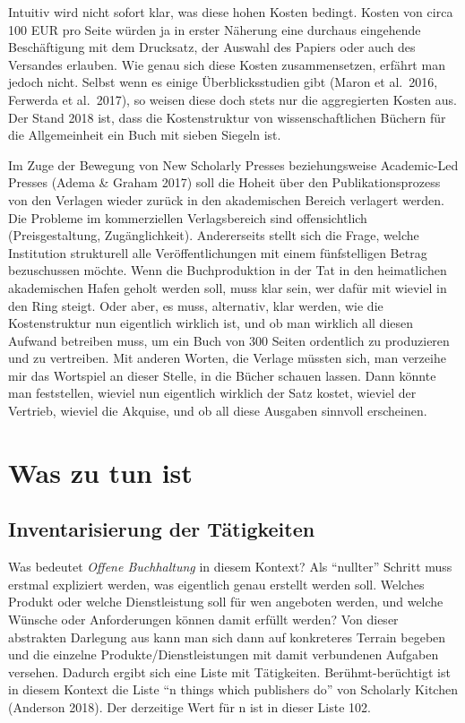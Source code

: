 \documentclass[a4paper,
fontsize=11pt,
oneside,
numbers=noperiodatend,
parskip=half-,
bibliography=totoc,
final
]{scrartcl}
\begin{document}
Intuitiv wird nicht sofort klar, was diese hohen Kosten bedingt. Kosten
von circa 100 EUR pro Seite würden ja in erster Näherung eine durchaus
eingehende Beschäftigung mit dem Drucksatz, der Auswahl des Papiers oder
auch des Versandes erlauben. Wie genau sich diese Kosten zusammensetzen,
erfährt man jedoch nicht. Selbst wenn es einige Überblicksstudien gibt
(Maron et al.~2016, Ferwerda et al.~2017), so weisen diese doch stets
nur die aggregierten Kosten aus. Der Stand 2018 ist, dass die
Kostenstruktur von wissenschaftlichen Büchern für die Allgemeinheit ein
Buch mit sieben Siegeln ist.

Im Zuge der Bewegung von New Scholarly Presses beziehungsweise
Academic-Led Presses (Adema \& Graham 2017) soll die Hoheit über den
Publikationsprozess von den Verlagen wieder zurück in den akademischen
Bereich verlagert werden. Die Probleme im kommerziellen Verlagsbereich
sind offensichtlich (Preisgestaltung, Zugänglichkeit). Andererseits
stellt sich die Frage, welche Institution strukturell alle
Veröffentlichungen mit einem fünfstelligen Betrag bezuschussen möchte.
Wenn die Buchproduktion in der Tat in den heimatlichen akademischen
Hafen geholt werden soll, muss klar sein, wer dafür mit wieviel in den
Ring steigt. Oder aber, es muss, alternativ, klar werden, wie die
Kostenstruktur nun eigentlich wirklich ist, und ob man wirklich all
diesen Aufwand betreiben muss, um ein Buch von 300 Seiten ordentlich zu
produzieren und zu vertreiben. Mit anderen Worten, die Verlage müssten
sich, man verzeihe mir das Wortspiel an dieser Stelle, in die Bücher
schauen lassen. Dann könnte man feststellen, wieviel nun eigentlich
wirklich der Satz kostet, wieviel der Vertrieb, wieviel die Akquise, und
ob all diese Ausgaben sinnvoll erscheinen.

\hypertarget{was-zu-tun-ist}{%
\section{Was zu tun ist}\label{was-zu-tun-ist}}

\hypertarget{inventarisierung-der-tuxe4tigkeiten}{%
\subsection{Inventarisierung der
Tätigkeiten}\label{inventarisierung-der-tuxe4tigkeiten}}

Was bedeutet \emph{Offene Buchhaltung} in diesem Kontext? Als
\enquote{nullter} Schritt muss erstmal expliziert werden, was eigentlich
genau erstellt werden soll. Welches Produkt oder welche Dienstleistung
soll für wen angeboten werden, und welche Wünsche oder Anforderungen
können damit erfüllt werden? Von dieser abstrakten Darlegung aus kann
man sich dann auf konkreteres Terrain begeben und die einzelne
Produkte/Dienstleistungen mit damit verbundenen Aufgaben versehen.
Dadurch ergibt sich eine Liste mit Tätigkeiten. Berühmt-berüchtigt ist
in diesem Kontext die Liste \enquote{n things which publishers do} von
Scholarly Kitchen (Anderson 2018). Der derzeitige Wert für n ist in
dieser Liste 102.
\end{document}
